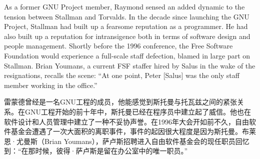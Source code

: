 \ifdefined\eng
As a former GNU Project member, Raymond sensed an added dynamic to the tension between Stallman and Torvalds. In the decade since launching the GNU Project, Stallman had built up a fearsome reputation as a programmer. He had also built up a reputation for intransigence both in terms of software design and people management. Shortly before the 1996 conference, the Free Software Foundation would experience a full-scale staff defection, blamed in large part on Stallman. Brian Youmans, a current FSF staffer hired by Salus in the wake of the resignations, recalls the scene: ``At one point, Peter [Salus] was the only staff member working in the office.''
\fi

\ifdefined\chs
雷蒙德曾经是一名GNU工程的成员，他能感觉到斯托曼与托瓦兹之间的紧张关系。在GNU工程开始的前十年中，斯托曼已经在程序员中建立起了威信。他也在软件设计和人员管理中建立了一种不妥协声誉。在1996年大会开如前不久，自由软件基金会遭遇了一次大面积的离职事件，事件的起因很大程度是因为斯托曼。布莱恩·尤曼斯（Brian Youmans），萨卢斯招聘进入自由软件基金会的现任职员回忆到：``在那时候，彼得·萨卢斯是留在办公室中的唯一职员。''
\fi






